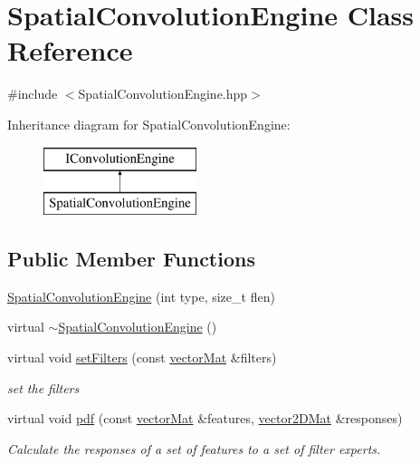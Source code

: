\hypertarget{class_spatial_convolution_engine}{\section{Spatial\-Convolution\-Engine Class Reference}
\label{class_spatial_convolution_engine}
}


{\ttfamily \#include $<$Spatial\-Convolution\-Engine.\-hpp$>$}

Inheritance diagram for Spatial\-Convolution\-Engine\-:\begin{figure}[H]
\begin{center}
\leavevmode
\includegraphics[height=2.000000cm]{class_spatial_convolution_engine}
\end{center}
\end{figure}
\subsection*{Public Member Functions}
\begin{DoxyCompactItemize}
\item 
\hyperlink{class_spatial_convolution_engine_a934e9613ba487297befd6e064bbd5d7a}{Spatial\-Convolution\-Engine} (int type, size\-\_\-t flen)
\item 
virtual \hyperlink{class_spatial_convolution_engine_a07b28be0c28a1c47bc6f2a7459155802}{$\sim$\-Spatial\-Convolution\-Engine} ()
\item 
virtual void \hyperlink{class_spatial_convolution_engine_ad27aad7b65dfa3ec6a617eed96c01d9c}{set\-Filters} (const \hyperlink{types_8hpp_a3207a7addcfa415d1c83622febcb1e9b}{vector\-Mat} \&filters)
\begin{DoxyCompactList}\small\item\em set the filters \end{DoxyCompactList}\item 
virtual void \hyperlink{class_spatial_convolution_engine_a6db3b5e9428ee74e1b4e9e7f7111cad5}{pdf} (const \hyperlink{types_8hpp_a3207a7addcfa415d1c83622febcb1e9b}{vector\-Mat} \&features, \hyperlink{types_8hpp_a33cacb85be7b8df3dc0b67d5d849f4cc}{vector2\-D\-Mat} \&responses)
\begin{DoxyCompactList}\small\item\em Calculate the responses of a set of features to a set of filter experts. \end{DoxyCompactList}\end{DoxyCompactItemize}
